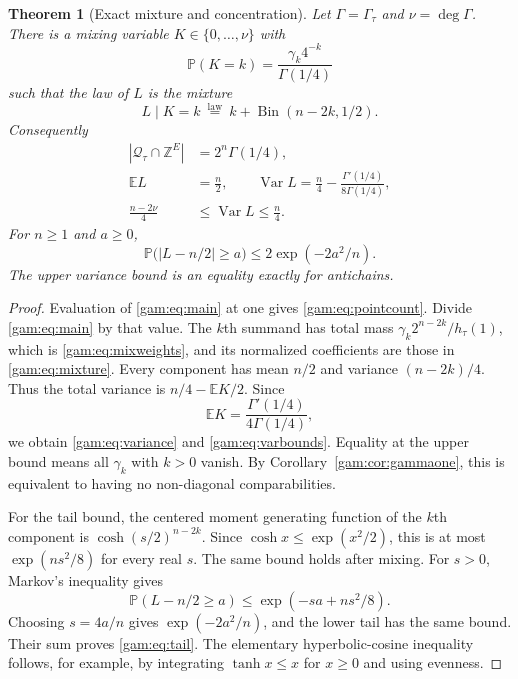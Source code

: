 \documentclass[11pt]{article}
\numberwithin{equation}{section}
\newtheorem{theorem}{Theorem}[section]
\theoremstyle{definition}
\newcommand{\Z}{\mathbb Z}
\newcommand{\Qt}{\mathcal Q_\tau}
\newcommand{\Var}{\operatorname{Var}}
\newcommand{\EE}{\mathbb E}
\newcommand{\PP}{\mathbb P}
\begin{document}
\begin{theorem}[Exact mixture and concentration]\label{gam:thm:statistics}
Let $\Gamma=\Gamma_\tau$ and $\nu=\deg\Gamma$. There is a mixing variable
$K\in\{0,\ldots,\nu\}$ with
\begin{equation}
 \PP(K=k)=\frac{\gamma_k4^{-k}}{\Gamma(1/4)}
 \label{gam:eq:mixweights}
\end{equation}
such that the law of $L$ is the mixture
\begin{equation}
 L\mid K=k\ \overset{\mathrm{law}}=\ k+\operatorname{Bin}(n-2k,1/2).
 \label{gam:eq:mixture}
\end{equation}
Consequently
\begin{align}
 |\Qt\cap\Z^E|&=2^n\Gamma(1/4),\label{gam:eq:pointcount}\\
 \EE L&=\frac n2,\qquad
 \Var L=\frac n4-\frac{\Gamma'(1/4)}{8\Gamma(1/4)},
 \label{gam:eq:variance}\\
 \frac{n-2\nu}{4}&\le\Var L\le\frac n4.\label{gam:eq:varbounds}
\end{align}
For $n\ge1$ and $a\ge0$,
\begin{equation}
 \PP\bigl(|L-n/2|\ge a\bigr)\le 2\exp(-2a^2/n).
 \label{gam:eq:tail}
\end{equation}
The upper variance bound is an equality exactly for antichains.
\end{theorem}
\begin{proof}
Evaluation of \eqref{gam:eq:main} at one gives \eqref{gam:eq:pointcount}. Divide
\eqref{gam:eq:main} by that value. The $k$th summand has total mass
$\gamma_k2^{n-2k}/h_\tau(1)$, which is \eqref{gam:eq:mixweights}, and its
normalized coefficients are those in \eqref{gam:eq:mixture}. Every component
has mean $n/2$ and variance $(n-2k)/4$. Thus the total variance is
$n/4-\EE K/2$. Since
\[
 \EE K=\frac{\Gamma'(1/4)}{4\Gamma(1/4)},
\]
we obtain \eqref{gam:eq:variance} and \eqref{gam:eq:varbounds}. Equality at the
upper bound means all $\gamma_k$ with $k>0$ vanish. By
Corollary~\ref{gam:cor:gammaone}, this is equivalent to having no non-diagonal
comparabilities.

For the tail bound, the centered moment generating function of the $k$th
component is $\cosh(s/2)^{n-2k}$. Since
$\cosh x\le\exp(x^2/2)$, this is at most $\exp(ns^2/8)$ for every real $s$.
The same bound holds after mixing. For $s>0$, Markov's inequality gives
\[
 \PP(L-n/2\ge a)\le\exp(-sa+ns^2/8).
\]
Choosing $s=4a/n$ gives $\exp(-2a^2/n)$, and the lower tail has the same
bound. Their sum proves \eqref{gam:eq:tail}. The elementary hyperbolic-cosine
inequality follows, for example, by integrating $\tanh x\le x$ for
$x\ge0$ and using evenness.
\end{proof}
\end{document}
